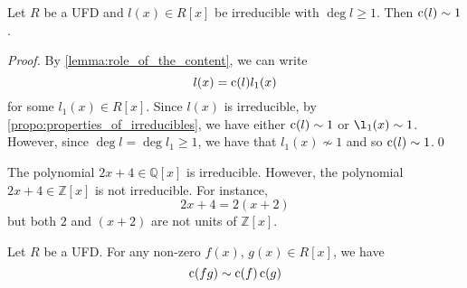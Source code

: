 \begin{lemma}
\label{lemma:non_trivial_irreducible_polynomials_are_primitive}
Let $R$ be a UFD and $l(x) \in R[x]$ be irreducible with $\deg l \geq 1$. Then $\operatorname{c}(l) \sim 1$.
\end{lemma}

\begin{proof}
  By \cref{lemma:role_of_the_content}, we can write
  \begin{equation*}
    l(x) = \operatorname{c}(l) l_1(x)
  \end{equation*}
  for some $l_1(x) \in R[x]$. Since $l(x)$ is irreducible, by \cref{propo:properties_of_irreducibles}, we have either $\operatorname{c}(l) \sim 1$ or $\l_1(x) \sim 1$. However, since $\deg l = \deg l_1 \geq 1$, we have that $l_1(x) \not\sim 1$ and so $\operatorname{c}(l) \sim 1$.\qed
\end{proof}

\begin{eg}\label{eq:irreducibility_in_field_of_fractions_does_not_imply_irreducibility_in_the_original_ring}
  The polynomial $2x + 4 \in \mathbb{Q}[x]$ is irreducible. However, the polynomial $2x + 4 \in \mathbb{Z}[x]$ is not irreducible. For instance,
  \begin{equation*}
    2x + 4 = 2(x + 2)
  \end{equation*}
  but both $2$ and $(x + 2)$ are not units of $\mathbb{Z}[x]$.
\end{eg}

\begin{thm}
\label{thm:gauss_lemma}
  Let $R$ be a UFD. For any non-zero $f(x), \, g(x) \in R[x]$, we have
  \begin{equation*}
    \operatorname{c}(fg) \sim \operatorname{c}(f) \operatorname{c}(g)
  \end{equation*}
\end{thm}

